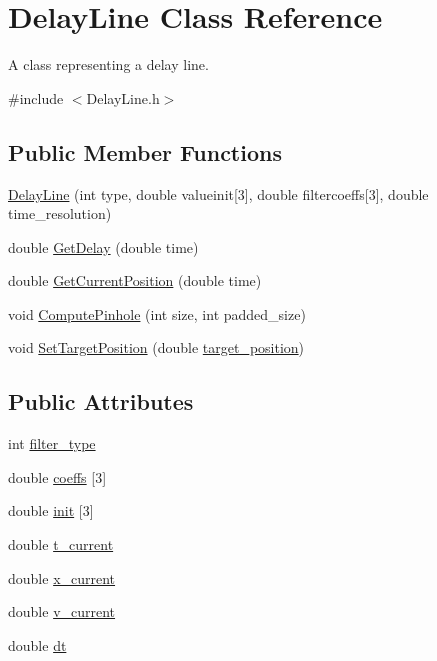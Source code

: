 \hypertarget{classDelayLine}{
\section{DelayLine Class Reference}
\label{classDelayLine}
}


A class representing a delay line.  




{\ttfamily \#include $<$DelayLine.h$>$}

\subsection*{Public Member Functions}
\begin{DoxyCompactItemize}
\item 
\hyperlink{classDelayLine_aae3ff3e21f8887d0df1948e13c093b90}{DelayLine} (int type, double valueinit\mbox{[}3\mbox{]}, double filtercoeffs\mbox{[}3\mbox{]}, double time\_\-resolution)
\item 
double \hyperlink{classDelayLine_af03fce4b30c09428624fcf27bb6d8476}{GetDelay} (double time)
\item 
double \hyperlink{classDelayLine_a230dfa049c8b66e41e028c15b63d23fa}{GetCurrentPosition} (double time)
\item 
void \hyperlink{classDelayLine_aa11d93779cebcc3a57b920a5fcbda891}{ComputePinhole} (int size, int padded\_\-size)
\item 
void \hyperlink{classDelayLine_aaea9efb6c8a6e791ac75f9bac6c4fe8e}{SetTargetPosition} (double \hyperlink{classDelayLine_a27fb66446caf539997819c3600e5299e}{target\_\-position})
\end{DoxyCompactItemize}
\subsection*{Public Attributes}
\begin{DoxyCompactItemize}
\item 
int \hyperlink{classDelayLine_a86b4adda2792d346ee78b59a3e26992a}{filter\_\-type}
\item 
double \hyperlink{classDelayLine_a55d069a045ac765d5783f41a2348fdd4}{coeffs} \mbox{[}3\mbox{]}
\item 
double \hyperlink{classDelayLine_a998ede89f80499652d8f1da052fc90de}{init} \mbox{[}3\mbox{]}
\item 
double \hyperlink{classDelayLine_ae46cf8249f9040270c5ffb1289e5f760}{t\_\-current}
\item 
double \hyperlink{classDelayLine_a36cd2a92c561630bbaa6646f23a00626}{x\_\-current}
\item 
double \hyperlink{classDelayLine_a4d51575ded15097f1a837d3ceeaf6bec}{v\_\-current}
\item 
double \hyperlink{classDelayLine_a4086dcba3b4835c3a1f2072768e6b8c2}{dt}
\end{DoxyCompactItemize}
